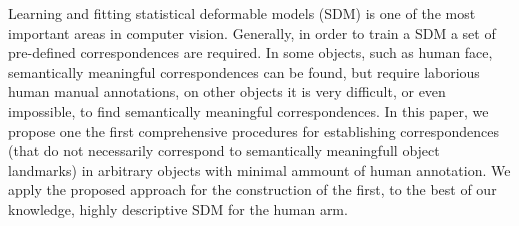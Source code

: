 Learning and fitting statistical deformable models (SDM) is one of the most important areas in computer vision. Generally, in order to train a SDM a set of pre-defined correspondences are required. In some objects, such as human face, semantically meaningful correspondences can be found, but require laborious human manual annotations, on other objects it is very difficult, or even impossible, to find semantically meaningful correspondences. In this paper, we propose one the first comprehensive procedures for establishing correspondences (that do not necessarily correspond to semantically meaningfull object landmarks) in arbitrary objects with minimal ammount of human annotation. We apply the proposed approach for the construction of the first, to the best of our knowledge, highly descriptive SDM for the human arm.     